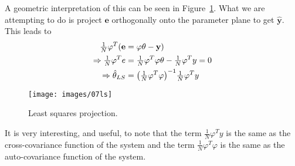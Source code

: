 A geometric interpretation of this can be seen in Figure~\ref{fig:07ls}.
What we are attempting to do is project $\mathbf{e}$ orthogonally onto the parameter plane to get $\hat{\mathbf{y}}$.
This leads to
\begin{align*}
\tfrac{1}{N}\varphi^T(\mathbf{e} &= \mathbf{\varphi}\mathbf{\theta} - \mathbf{y}) \\
\Rightarrow \tfrac{1}{N}\varphi^T e &= \tfrac{1}{N}\varphi^T\varphi\theta - \tfrac{1}{N}\varphi^T y = 0 \\
\Rightarrow \hat{\theta}_{LS} &= {\left(\tfrac{1}{N}\varphi^T \varphi\right)}^{-1} \tfrac{1}{N}\varphi^T y
\end{align*}

\begin{figure}[ht!]
\centering
\texttt{[image: images/07ls]}
\caption{Least squares projection.}%
\label{fig:07ls}
\end{figure}

It is very interesting, and useful, to note that the term $\tfrac{1}{N}\varphi^T y$ is the same as the cross-covariance function of the system and the term $\tfrac{1}{N}\varphi^T\varphi$ is the same as the auto-covariance function of the system.
